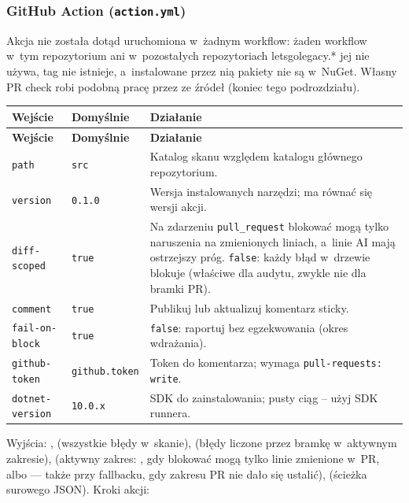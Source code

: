 \subsubsection{GitHub Action (\texttt{action.yml})}

Akcja nie została dotąd uruchomiona w~żadnym workflow: żaden workflow w~tym repozytorium ani
w~pozostałych repozytoriach letsgolegacy.* jej nie używa, tag  nie istnieje, a~instalowane
przez nią pakiety nie są w~NuGet. Własny PR check robi podobną pracę przez 
ze źródeł (koniec tego podrozdziału).

\begingroup\small
\begin{xltabular}{\linewidth}{@{}>{\raggedright\arraybackslash}p{2.6cm} >{\raggedright\arraybackslash}p{2.4cm} >{\raggedright\arraybackslash}X@{}}
\toprule
\textbf{Wejście} & \textbf{Domyślnie} & \textbf{Działanie} \\
\midrule
\endfirsthead
\toprule
\textbf{Wejście} & \textbf{Domyślnie} & \textbf{Działanie} \\
\midrule
\endhead
\texttt{path} & \texttt{src} & Katalog skanu względem katalogu głównego repozytorium. \\
\texttt{version} & \texttt{0.1.0} & Wersja instalowanych narzędzi; ma równać się wersji akcji. \\
\texttt{diff-scoped} & \texttt{true} & Na zdarzeniu \texttt{pull\_request} blokować mogą tylko naruszenia na zmienionych liniach, a~linie AI mają ostrzejszy próg. \texttt{false}: każdy błąd w~drzewie blokuje (właściwe dla audytu, zwykle nie dla bramki PR). \\
\texttt{comment} & \texttt{true} & Publikuj lub aktualizuj komentarz sticky. \\
\texttt{fail-on-block} & \texttt{true} & \texttt{false}: raportuj bez egzekwowania (okres wdrażania). \\
\texttt{github-token} & \texttt{github.token} & Token do komentarza; wymaga \texttt{pull-requests: write}. \\
\texttt{dotnet-version} & \texttt{10.0.x} & SDK do zainstalowania; pusty ciąg -- użyj SDK runnera. \\
\bottomrule
\end{xltabular}
\endgroup

Wyjścia: ,  (wszystkie błędy w~skanie),
 (błędy liczone przez bramkę w~aktywnym zakresie),
 (aktywny zakres: , gdy blokować mogą tylko linie
zmienione w~PR, albo  --- także przy fallbacku, gdy zakresu PR nie dało się
ustalić),  (ścieżka surowego JSON). Kroki akcji:

